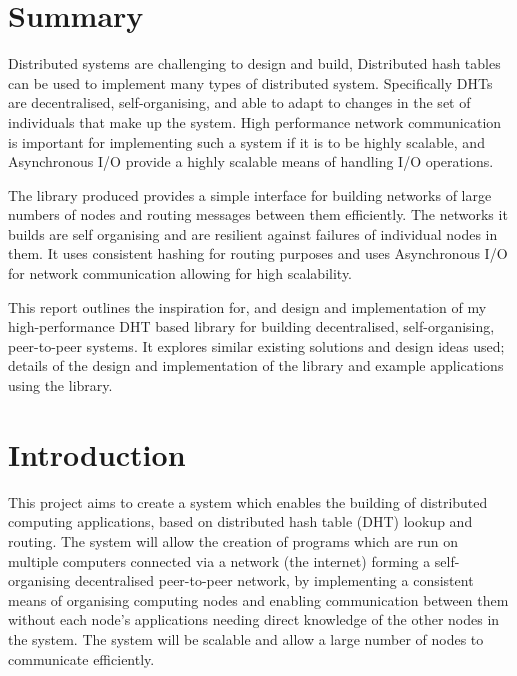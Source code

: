 \documentclass{article}
\begin{document}
\section*{Summary}
{
Distributed systems are challenging to design and build, Distributed hash tables can be used to implement many types of distributed system. Specifically DHTs are decentralised, self-organising, and able to adapt to changes in the set of individuals that make up the system. High performance network communication is important for implementing such a system if it is to be highly scalable, and Asynchronous I/O provide a highly scalable means of handling I/O operations.

The library produced provides a simple interface for building networks of large numbers of nodes and routing messages between them efficiently. The networks it builds are self organising and are resilient against failures of individual nodes in them. It uses consistent hashing for routing purposes and uses Asynchronous I/O for network communication allowing for high scalability.

This report outlines the inspiration for, and design and implementation of my high-performance DHT based library for building decentralised, self-organising, peer-to-peer systems. It explores similar existing solutions and design ideas used; details of the design and implementation of the library and example applications using the library.

}

\newpage
\tableofcontents
\newpage


\section{Introduction}

This project aims to create a system which enables the building of distributed computing applications, based on distributed hash table (DHT) lookup and routing. The system will allow the creation of programs which are run on multiple computers connected via a network (the internet) forming a self-organising decentralised peer-to-peer network, by implementing a consistent means of organising computing nodes and enabling communication between them without each node's applications needing direct knowledge of the other nodes in the system.
The system will be scalable and allow a large number of nodes to communicate efficiently.
\end{document}
